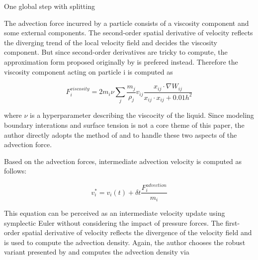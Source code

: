 \documentclass[
	11pt, 
	DIV10,
	ngerman,
	a4paper, 
	oneside, 
	headings=normal, 
	captions=tableheading,
	final, 
	numbers=noenddot
]{scrartcl}
\begin{document}
\large
\begin{algorithm}
	\DontPrintSemicolon
	\SetAlgoLined
	\SetAlCapNameFnt{\large}
	\SetAlCapFnt{\large}
	\caption{\label{alg1} One global step with splitting \cite{reinhardt2017fully}}
\end{algorithm}
\normalsize

The advection force incurred by a particle consists of a viscosity component and some external components. The second-order spatial derivative of velocity reflects the diverging trend of the local velocity field and decides the viscosity component. But since second-order derivatives are tricky to compute, the approximation form proposed originally by \cite{monaghan1992smoothed} is prefered instead. Therefore the viscosity component acting on particle i is computed as

\begin{equation}
	\label{eq2}
	F_{i}^{viscosity} = 2m_{i}\nu \sum_{j}\frac{m_{j}}{\rho_{j}}v_{ij}\frac{x_{ij} \cdot \nabla W_{ij}}{x_{ij}\cdot x_{ij} + 0.01h^{2}}
\end{equation}

where $ \nu $ is a hyperparameter describing the viscocity of the liquid. Since modeling boundary interations and surface tension is not a core theme of this paper, the author directly adopts the method of \cite{akinci2012versatile} and \cite{huber2015evaluation} to handle these two aspects of the advection force.
\par
Based on the advection forces, intermediate advection velocity is computed as follows:

\begin{equation}
	\label{eq3}
	v_{i}^{*} = v_{i}(t) + \delta t\frac{F_{i}^{advection}}{m_{i}}
\end{equation}

This equation can be perceived as an intermediate velocity update using symplectic Euler without considering the impact of pressure forces. The first-order spatial derivative of velocity reflects the divergence of the velocity field and is used to compute the advection density. Again, the author chooses the robust variant presented by \cite{monaghan1992smoothed} and computes the advection density via
\end{document}
